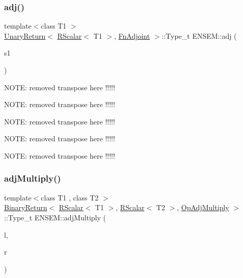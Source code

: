 \subsubsection{\texorpdfstring{adj()}{adj()}}
{\footnotesize\ttfamily template$<$class T1 $>$ \\
\mbox{\hyperlink{structENSEM_1_1UnaryReturn}{Unary\+Return}}$<$ \mbox{\hyperlink{classENSEM_1_1RScalar}{R\+Scalar}}$<$ T1 $>$, \mbox{\hyperlink{structENSEM_1_1FnAdjoint}{Fn\+Adjoint}} $>$\+::Type\+\_\+t E\+N\+S\+E\+M\+::adj (\begin{DoxyParamCaption}\item[{const \mbox{\hyperlink{classENSEM_1_1RScalar}{R\+Scalar}}$<$ T1 $>$ \&}]{s1 }\end{DoxyParamCaption})\hspace{0.3cm}{\ttfamily [inline]}}

N\+O\+TE\+: removed transpose here !!!!!

N\+O\+TE\+: removed transpose here !!!!!

N\+O\+TE\+: removed transpose here !!!!!

N\+O\+TE\+: removed transpose here !!!!!

N\+O\+TE\+: removed transpose here !!!!! \mbox{\label{group__rscalar_gaed3e42d4304edfd5a3838b8b1b559e37}} 
\subsubsection{\texorpdfstring{adjMultiply()}{adjMultiply()}}
{\footnotesize\ttfamily template$<$class T1 , class T2 $>$ \\
\mbox{\hyperlink{structENSEM_1_1BinaryReturn}{Binary\+Return}}$<$ \mbox{\hyperlink{classENSEM_1_1RScalar}{R\+Scalar}}$<$ T1 $>$, \mbox{\hyperlink{classENSEM_1_1RScalar}{R\+Scalar}}$<$ T2 $>$, \mbox{\hyperlink{structENSEM_1_1OpAdjMultiply}{Op\+Adj\+Multiply}} $>$\+::Type\+\_\+t E\+N\+S\+E\+M\+::adj\+Multiply (\begin{DoxyParamCaption}\item[{const \mbox{\hyperlink{classENSEM_1_1RScalar}{R\+Scalar}}$<$ T1 $>$ \&}]{l,  }\item[{const \mbox{\hyperlink{classENSEM_1_1RScalar}{R\+Scalar}}$<$ T2 $>$ \&}]{r }\end{DoxyParamCaption})\hspace{0.3cm}{\ttfamily [inline]}}

